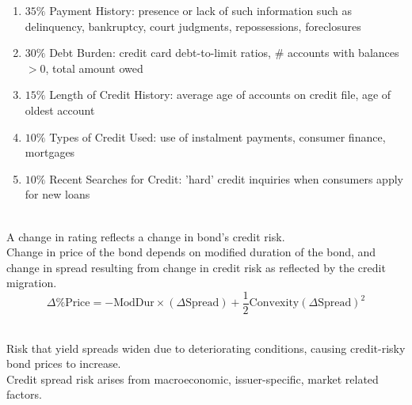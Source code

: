 \begin{remark} 
\begin{enumerate}[label=\roman*.]
\setlength{\itemsep}{0pt}
\item $35\%$ Payment History: presence or lack of such information such as delinquency, bankruptcy, court judgments, repossessions, foreclosures
\item $30\%$ Debt Burden: credit card debt-to-limit ratios, $\#$ accounts with balances $>0$, total amount owed
\item $15\%$ Length of Credit History: average age of accounts on credit file, age of oldest account
\item $10\%$ Types of Credit Used: use of instalment payments, consumer finance, mortgages
\item $10\%$ Recent Searches for Credit: 'hard' credit inquiries when consumers apply for new loans
\end{enumerate}
\end{remark}

\begin{definition} \\
A change in rating reflects a change in bond's credit risk.\\
Change in price of the bond depends on modified duration of the bond, and change in spread resulting from change in credit risk as reflected by the credit migration.
\begin{equation}
\Delta \% \text{Price} = - \text{ModDur} \times (\Delta \text{Spread}) + \frac{1}{2} \text{Convexity}(\Delta \text{Spread})^2 \nonumber
\end{equation}
\end{definition}

\begin{definition} \\
Risk that yield spreads widen due to deteriorating conditions, causing credit-risky bond prices to increase.\\
Credit spread risk arises from macroeconomic, issuer-specific, market related factors.
\end{definition}

\begin{remark} 
\end{remark}

